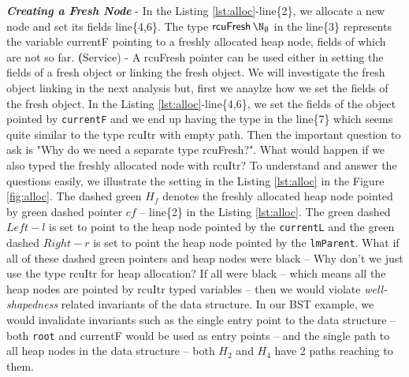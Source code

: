 \textit{\textbf{Creating a Fresh Node}} - In the Listing \ref{lst:alloc}-line\{2\}, we allocate a new node and set its fields line\{4,6\}. The type $\textsf{rcuFresh} \, \N_{\emptyset}$ in the line\{3\} represents the variable \textsf{currentF} pointing to a freshly allocated heap node, fields of which are not so far. \textbf(Service) - A \textsf{rcuFresh} pointer can be used either in setting the fields of a fresh object or linking the fresh object. We will investigate the fresh object linking in the next analysis but, first we anaylze how we set the  fields of the fresh object. In the Listing \ref{lst:alloc}-line\{4,6\}, we set the fields of the object pointed by \texttt{currentF} and we end up having the type in the line\{7\} which seems quite similar to the type \textsf{rcuItr} with empty path. Then the important question to ask is "Why do we need a separate type \textsf{rcuFresh}?". What would happen if we also typed the freshly allocated node with \textsf{rcuItr}? To understand and answer the questions easily, we illustrate the setting in the Listing \ref{lst:alloc} in the Figure \ref{fig:alloc}. The dashed green $H_f$ denotes the freshly allocated heap node pointed by green dashed pointer $cf$ -- line\{2\} in the Listing \ref{lst:alloc}. The green dashed $Left-l$ is set to point to the heap node pointed by the \texttt{currentL} and the green dashed $Right-r$ is set to point the heap node pointed by the \texttt{lmParent}. What if all of these dashed green pointers and heap nodes were black -- Why don't we just use the type \textsf{rcuItr} for heap allocation? If all were black -- which means all the heap nodes are pointed by \textsf{rcuItr} typed variables -- then we would violate \textit{well-shapedness} related invariants of the data structure. In our \textsf{BST} example, we would invalidate invariants such as the single entry point to the data structure -- both \texttt{root} and \textsf{currentF} would be used as entry points -- and the single path to all heap nodes in the data structure -- both $H_2$ and $H_4$ have 2 paths reaching to them. 

